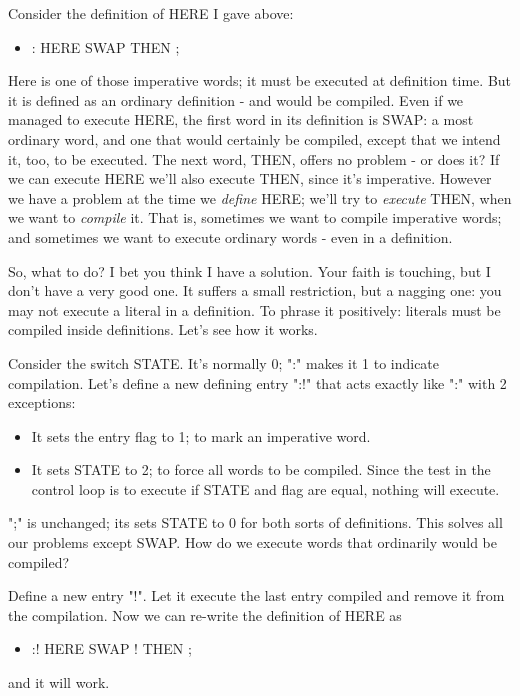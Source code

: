 \documentclass[b5paper, oneside]{book}
\begin{document}
Consider the definition of HERE I gave above:\begin{itemize}
   \item : HERE SWAP THEN ;\end{itemize}
Here is one of those imperative words; it must be executed at definition time. But it is defined as an ordinary definition - and would be compiled. Even if we managed to execute HERE, the first word in its definition is SWAP: a most ordinary word, and one that would certainly be compiled, except that we intend it, too, to be executed. The next word, THEN, offers no problem - or does it? If we can execute HERE we'll also execute THEN, since it's imperative. However we have a problem at the time we {\em define} HERE; we'll try to {\em execute} THEN, when we want to {\em compile} it. That is, sometimes we want to compile imperative words; and sometimes we want to execute ordinary words - even in a definition.

So, what to do? I bet you think I have a solution. Your faith is touching, but I don't have a very good one. It suffers a small restriction, but a nagging one: you may not execute a literal in a definition. To phrase it positively: literals must be compiled inside definitions. Let's see how it works.

Consider the switch STATE. It's normally 0; ":" makes it 1 to indicate compilation. Let's define a new defining entry ":!" that acts exactly like ":" with 2 exceptions:\begin{itemize}
   \item It sets the entry flag to 1; to mark an imperative word.
   \item It sets STATE to 2; to force all words to be compiled. Since the test in the control loop is to execute if STATE and flag are equal, nothing will execute.\end{itemize}
";" is unchanged; its sets STATE to 0 for both sorts of definitions. This solves all our problems except SWAP. How do we execute words that ordinarily would be compiled?

Define a new entry "!". Let it execute the last entry compiled and remove it from the compilation. Now we can re-write the definition of HERE as\begin{itemize}
   \item :! HERE SWAP ! THEN ;\end{itemize}
and it will work.
\end{document}
